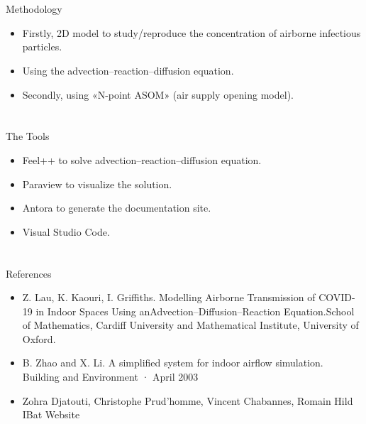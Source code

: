 \documentclass[10pt]{beamer}
\newcommand{\PIV}{}
\newcommand{\PV}{}
\newcommand{\PVI}{}
\begin{document}
\section{\PIV} 
\begin{frame}{Methodology}{\PIV} 
    \begin{itemize}
        \item Firstly, 2D model to study/reproduce the concentration of airborne infectious particles.
        \item Using the advection–reaction–diffusion equation.
        \item Secondly, using «N-point ASOM» (air supply opening model).
    \end{itemize}  

\end{frame}

\section{\PV} 
\begin{frame}{The Tools}{\PV} 
    \begin{itemize}
        \item Feel++ to solve advection–reaction–diffusion equation.
        \item Paraview to visualize the solution.
        \item Antora to generate the documentation site.
        \item Visual Studio Code.
    \end{itemize}  

\end{frame}

\section{\PVI} 
\begin{frame}{References }{\PVI} 
    \begin{itemize}
        \item Z. Lau, K. Kaouri, I. Griffiths. Modelling Airborne Transmission of COVID-19 in Indoor Spaces Using anAdvection–Diffusion–Reaction Equation.School of Mathematics, Cardiff University and Mathematical Institute, University of Oxford.
        \item B. Zhao and X. Li. A simplified system for indoor airflow simulation. Building and Environment · April 2003
        \item Zohra Djatouti, Christophe Prud’homme, Vincent Chabannes, Romain Hild IBat Website 
    \end{itemize}  

\end{frame}
\end{document}

